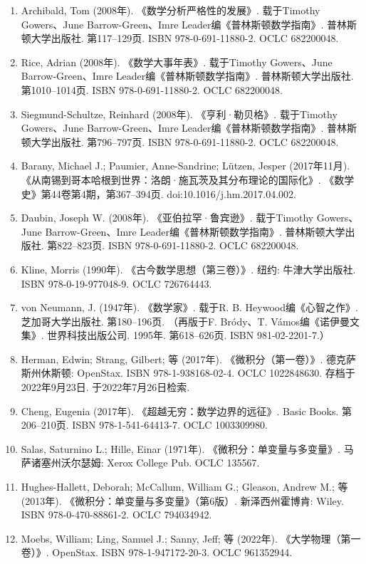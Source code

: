 \begin{enumerate}
\item Archibald, Tom (2008年). 《数学分析严格性的发展》. 载于Timothy Gowers、June Barrow-Green、Imre Leader编《普林斯顿数学指南》. 普林斯顿大学出版社. 第117–129页. ISBN 978-0-691-11880-2. OCLC 682200048.  
\item Rice, Adrian (2008年). 《数学大事年表》. 载于Timothy Gowers、June Barrow-Green、Imre Leader编《普林斯顿数学指南》. 普林斯顿大学出版社. 第1010–1014页. ISBN 978-0-691-11880-2. OCLC 682200048.  
\item Siegmund-Schultze, Reinhard (2008年). 《亨利·勒贝格》. 载于Timothy Gowers、June Barrow-Green、Imre Leader编《普林斯顿数学指南》. 普林斯顿大学出版社. 第796–797页. ISBN 978-0-691-11880-2. OCLC 682200048.  
\item Barany, Michael J.; Paumier, Anne-Sandrine; Lützen, Jesper (2017年11月). 《从南锡到哥本哈根到世界：洛朗·施瓦茨及其分布理论的国际化》. 《数学史》第44卷第4期，第367–394页. doi:10.1016/j.hm.2017.04.002.  
\item Daubin, Joseph W. (2008年). 《亚伯拉罕·鲁宾逊》. 载于Timothy Gowers、June Barrow-Green、Imre Leader编《普林斯顿数学指南》. 普林斯顿大学出版社. 第822–823页. ISBN 978-0-691-11880-2. OCLC 682200048.  
\item Kline, Morris (1990年). 《古今数学思想（第三卷）》. 纽约: 牛津大学出版社. ISBN 978-0-19-977048-9. OCLC 726764443.  
\item von Neumann, J. (1947年). 《数学家》. 载于R. B. Heywood编《心智之作》. 芝加哥大学出版社. 第180–196页.  
（再版于F. Bródy、T. Vámos编《诺伊曼文集》. 世界科技出版公司. 1995年. 第618–626页. ISBN 981-02-2201-7.）  
\item Herman, Edwin; Strang, Gilbert; 等 (2017年). 《微积分（第一卷）》. 德克萨斯州休斯顿: OpenStax. ISBN 978-1-938168-02-4. OCLC 1022848630. 存档于2022年9月23日. 于2022年7月26日检索.  
\item Cheng, Eugenia (2017年). 《超越无穷：数学边界的远征》. Basic Books. 第206–210页. ISBN 978-1-541-64413-7. OCLC 1003309980.  
\item Salas, Saturnino L.; Hille, Einar (1971年). 《微积分：单变量与多变量》. 马萨诸塞州沃尔瑟姆: Xerox College Pub. OCLC 135567.  
\item Hughes-Hallett, Deborah; McCallum, William G.; Gleason, Andrew M.; 等 (2013年). 《微积分：单变量与多变量》（第6版）. 新泽西州霍博肯: Wiley. ISBN 978-0-470-88861-2. OCLC 794034942.  
\item Moebs, William; Ling, Samuel J.; Sanny, Jeff; 等 (2022年). 《大学物理（第一卷）》. OpenStax. ISBN 978-1-947172-20-3. OCLC 961352944.  

\end{enumerate}
